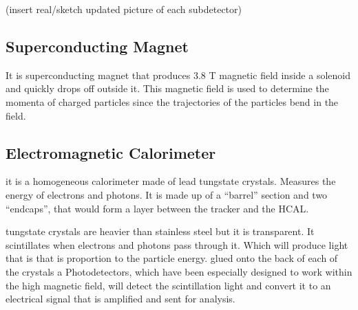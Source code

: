 (insert real/sketch updated picture of each subdetector)  

\subsection{Superconducting Magnet}


It is superconducting magnet that produces 3.8 T magnetic field inside a solenoid and quickly drops off outside it. This magnetic field is used to determine the momenta of charged particles since the trajectories of the particles bend in the field. 

\subsection{Electromagnetic Calorimeter}


it is a homogeneous calorimeter made of lead tungstate crystals. Measures the energy of electrons and photons. It is made up of a “barrel” section and two “endcaps”, that would form a layer between the tracker and the HCAL. 

tungstate crystals are heavier than stainless steel but it is transparent. It scintillates when electrons and photons pass through it. Which will produce light that is that is proportion to the particle energy. glued onto the back of each of the crystals a Photodetectors, which have been especially designed to work within the high magnetic field, will detect the scintillation light and convert it to an electrical signal that is amplified and sent for analysis. 

